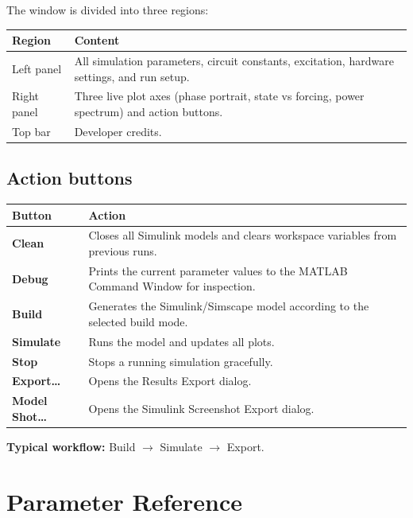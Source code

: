 \documentclass[12pt,a4paper]{article}
\begin{document}
The window is divided into three regions:

\begin{center}
\begin{tabular}{lp{9cm}}
\toprule
\textbf{Region} & \textbf{Content}\\
\midrule
Left panel  & All simulation parameters, circuit constants, excitation, hardware settings, and run setup.\\
Right panel & Three live plot axes (phase portrait, state vs forcing, power spectrum) and action buttons.\\
Top bar     & Developer credits.\\
\bottomrule
\end{tabular}
\end{center}

\subsection{Action buttons}

\begin{center}
\begin{tabular}{lp{9cm}}
\toprule
\textbf{Button} & \textbf{Action}\\
\midrule
\textbf{Clean}     & Closes all Simulink models and clears workspace variables from previous runs.\\
\textbf{Debug}     & Prints the current parameter values to the MATLAB Command Window for inspection.\\
\textbf{Build}     & Generates the Simulink/Simscape model according to the selected build mode.\\
\textbf{Simulate}  & Runs the model and updates all plots.\\
\textbf{Stop}      & Stops a running simulation gracefully.\\
\textbf{Export\ldots}    & Opens the Results Export dialog.\\
\textbf{Model Shot\ldots} & Opens the Simulink Screenshot Export dialog.\\
\bottomrule
\end{tabular}
\end{center}

\textbf{Typical workflow:} Build $\to$ Simulate $\to$ Export.

\section{Parameter Reference}
\end{document}
